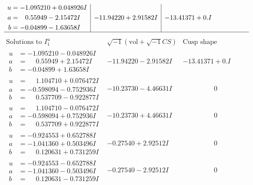 \documentclass[1p]{elsarticle_modified}
\theoremstyle{definition}
\newcommand{\I}{\sqrt{-1}}
\begin{document}
$$\begin{array}{c|c|c}
\begin{aligned}
u &= -1.095210 + 0.048926 I \\
a &= \phantom{-}0.55949 - 2.15472 I \\
b &= -0.04899 - 1.63658 I\end{aligned}
 & -11.94220 + 2.91582 I & -13.41371 + 0. I\phantom{ +0.000000I}\\
 \hline 
 \end{array}$$\newpage$$\begin{array}{c|c|c}  
\text{Solutions to }I^u_{1}& \I (\text{vol} + \sqrt{-1}CS) & \text{Cusp shape}\\
 \hline 
\begin{aligned}
u &= -1.095210 - 0.048926 I \\
a &= \phantom{-}0.55949 + 2.15472 I \\
b &= -0.04899 + 1.63658 I\end{aligned}
 & -11.94220 - 2.91582 I & -13.41371 + 0. I\phantom{ +0.000000I} \\ \hline\begin{aligned}
u &= \phantom{-}1.104710 + 0.076472 I \\
a &= -0.598094 - 0.752936 I \\
b &= \phantom{-}0.537709 - 0.922877 I\end{aligned}
 & -10.23730 - 4.46631 I & \phantom{-0.000000 } 0 \\ \hline\begin{aligned}
u &= \phantom{-}1.104710 - 0.076472 I \\
a &= -0.598094 + 0.752936 I \\
b &= \phantom{-}0.537709 + 0.922877 I\end{aligned}
 & -10.23730 + 4.46631 I & \phantom{-0.000000 } 0 \\ \hline\begin{aligned}
u &= -0.924553 + 0.652788 I \\
a &= -1.041360 + 0.503496 I \\
b &= \phantom{-}0.120631 + 0.731259 I\end{aligned}
 & -0.27540 + 2.92512 I & \phantom{-0.000000 } 0 \\ \hline\begin{aligned}
u &= -0.924553 - 0.652788 I \\
a &= -1.041360 - 0.503496 I \\
b &= \phantom{-}0.120631 - 0.731259 I\end{aligned}
 & -0.27540 - 2.92512 I & \phantom{-0.000000 } 0 \\ \hline\begin{aligned}

\end{aligned}
\end{array}$$
\end{document}
